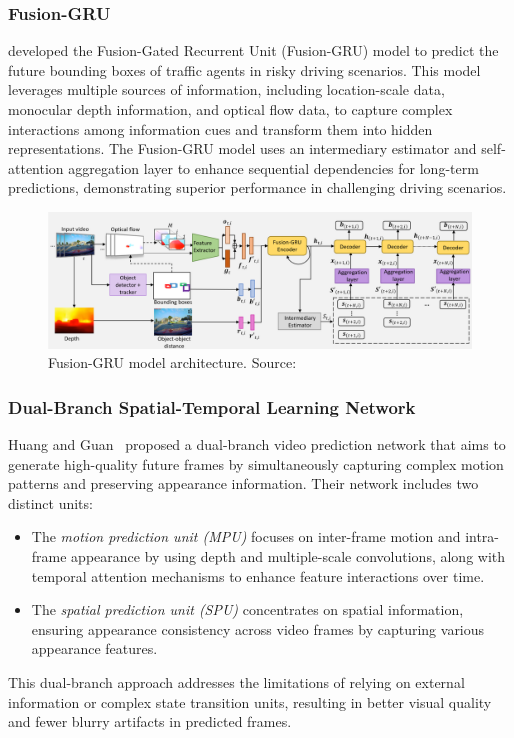 \documentclass[12pt,oneside]{book} %
\begin{document}
\subsubsection*{Fusion-GRU}
\citet{FusionGRU} developed the Fusion-Gated Recurrent
Unit (Fusion-GRU) model to predict the future bounding boxes of traffic agents
in risky driving scenarios. This model leverages multiple sources of
information, including location-scale data, monocular depth information, and
optical flow data, to capture complex interactions among information cues and
transform them into hidden representations. The Fusion-GRU model uses an
intermediary estimator and self-attention aggregation layer to enhance
sequential dependencies for long-term predictions, demonstrating superior
performance in challenging driving scenarios.

\begin{figure}[H]
    \centering
    \includegraphics[width=1\textwidth]{figures/FusionGRU.png}
    \caption{Fusion-GRU model architecture. Source:~\citet{FusionGRU}}\label{fig:fusion-gru}
\end{figure}

\subsubsection*{Dual-Branch Spatial-Temporal Learning Network}

Huang and Guan~\cite{DualBranchSpatialTemporalLearningNetworkVideoPrediction}
proposed a dual-branch video prediction network that aims to generate
high-quality future frames by simultaneously capturing complex motion patterns
and preserving appearance information. Their network includes two distinct
units:
\begin{itemize}
    \item The \textit{motion prediction unit (MPU)} focuses on inter-frame motion and
          intra-frame appearance by using depth and multiple-scale convolutions, along
          with temporal attention mechanisms to enhance feature interactions over time.
    \item The \textit{spatial prediction unit (SPU)} concentrates on spatial information,
          ensuring appearance consistency across video frames by capturing various
          appearance features.
\end{itemize}
This dual-branch approach addresses the limitations of relying on external information or complex state transition units, resulting in better visual quality and fewer blurry artifacts in predicted frames.
\end{document}
